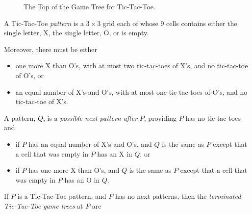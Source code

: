 \begin{definition}
\begin{figure}
\caption{The Top of the Game Tree for Tic-Tac-Toe.}
\label{fig:Tic-Tac-Toe}
\end{figure}


\iffalse
\[\begin{array}{c|c|c}
\hspace{.1in} & \hspace{.1in} & \hspace{.1in}\\
\hline  & &\\
\hline  & &
\end{array}\]

\textbf{FIGURE NEEDED}
\fi

\begin{definition}

A Tic-Tac-Toe \emph{pattern} is a $3 \times 3$ grid each of whose 9 cells
contains either the single letter, X, the single letter, O, or is
empty.
\begin{staffnotes}

Moreover, there must be either
\begin{itemize}

\item one more X than O's, with at most two tic-tac-toes of X's, and no
tic-tac-toe of O's, or

\item an equal number of X's and O's, with at most one tic-tac-toes of
O's, and no tic-tac-toe of X's.
\end{itemize}

\end{staffnotes}

A pattern, $Q$, is a \emph{possible next pattern after} $P$, providing $P$
has no tic-tac-toes and
\begin{itemize}

\item if $P$ has an equal number of X's and O's, and $Q$ is the same as
$P$ except that a cell that was empty in $P$ has an X in $Q$, or

\item if $P$ has one more X than O's, and $Q$ is the same as $P$ except
that a cell that was empty in $P$ has an O in $Q$.
\end{itemize}

If $P$ is a Tic-Tac-Toe pattern, and $P$ has no next patterns, then the
\emph{terminated Tic-Tac-Toe game trees} at $P$ are

\begin{itemize}


\end{itemize}
\end{definition}
\end{definition}
